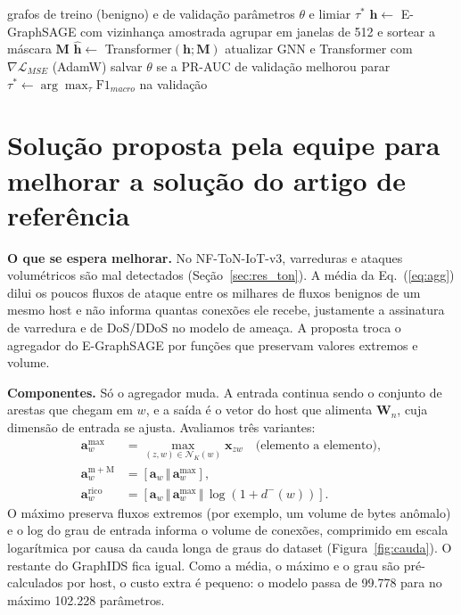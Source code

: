 \documentclass[conference]{IEEEtran}
\newcommand{\vect}[1]{\mathbf{#1}}
\begin{document}
\begin{algorithm}[t]
\small
\caption{Treino do GraphIDS}
\label{alg:treino}
\begin{algorithmic}[1]
\Require grafos de treino (benigno) e de validação
\Ensure parâmetros $\theta$ e limiar $\tau^\ast$
    \State $\vect{h}\leftarrow$ E-GraphSAGE com vizinhança amostrada
    \State agrupar em janelas de 512 e sortear a máscara $\vect{M}$
    \State $\hat{\vect{h}}\leftarrow$ Transformer$(\vect{h};\vect{M})$
    \State atualizar GNN e Transformer com $\nabla\mathcal{L}_{MSE}$ (AdamW)
  \EndFor
  \State salvar $\theta$ se a PR-AUC de validação melhorou
   parar \EndIf
\EndFor
\State $\tau^\ast\leftarrow\arg\max_\tau \mathrm{F1}_{macro}$ na validação
\end{algorithmic}
\end{algorithm}

\section{Solução proposta pela equipe para melhorar a solução do artigo de referência}
\label{sec:proposta}

\textbf{O que se espera melhorar.} No NF-ToN-IoT-v3, varreduras e ataques
volumétricos são mal detectados (Seção~\ref{sec:res_ton}). A média da
Eq.~(\ref{eq:agg}) dilui os poucos fluxos de ataque entre os milhares de fluxos
benignos de um mesmo host e não informa quantas conexões ele recebe, justamente
a assinatura de varredura e de DoS/DDoS no modelo de ameaça. A proposta troca o
agregador do E-GraphSAGE por funções que preservam valores extremos e volume.

\textbf{Componentes.} Só o agregador muda. A entrada continua sendo o conjunto
de arestas que chegam em $w$, e a saída é o vetor do host que alimenta
$\vect{W}_n$, cuja dimensão de entrada se ajusta. Avaliamos três variantes:
\begin{align}
\vect{a}^{\max}_w &= \max_{(z,w)\in\mathcal{N}_K(w)} \vect{x}_{zw} \quad\text{(elemento a elemento)},\\
\vect{a}^{\mathrm{m+M}}_w &= \left[\vect{a}_w \,\Vert\, \vect{a}^{\max}_w\right],\\
\vect{a}^{\mathrm{rico}}_w &= \left[\vect{a}_w \,\Vert\, \vect{a}^{\max}_w \,\Vert\, \log\left(1+d^{-}(w)\right)\right].
\end{align}
O máximo preserva fluxos extremos (por exemplo, um volume de bytes anômalo) e o
log do grau de entrada informa o volume de conexões, comprimido em escala
logarítmica por causa da cauda longa de graus do dataset
(Figura~\ref{fig:cauda}). O restante do GraphIDS fica igual. Como a média, o
máximo e o grau são pré-calculados por host, o custo extra é pequeno: o modelo
passa de 99.778 para no máximo 102.228 parâmetros.
\end{document}
